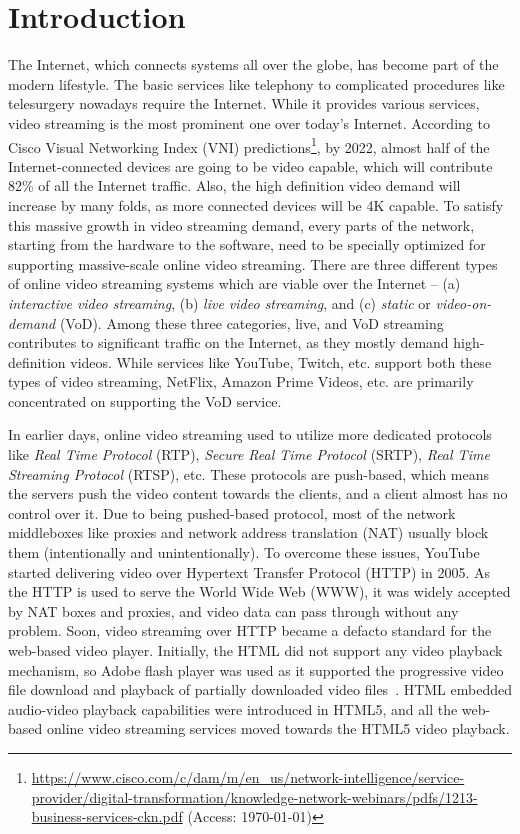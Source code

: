 \section{Introduction}
The Internet, which connects systems all over the globe, has become part of the modern lifestyle. The basic services like telephony to complicated procedures like telesurgery nowadays require the Internet. While it provides various services, video streaming is the most prominent one over today's Internet. According to Cisco Visual Networking Index (VNI) predictions\footnote{\url{https://www.cisco.com/c/dam/m/en_us/network-intelligence/service-provider/digital-transformation/knowledge-network-webinars/pdfs/1213-business-services-ckn.pdf} (Access: \today)}, by 2022, almost half of the Internet-connected devices are going to be video capable, which will contribute 82\% of all the Internet traffic. Also, the high definition video demand will increase by many folds, as more connected devices will be 4K capable. To satisfy this massive growth in video streaming demand, every parts of the network, starting from the hardware to the software, need to be specially optimized for supporting massive-scale online video streaming. There are three different types of online video streaming systems which are viable over the Internet -- (a) \textit{interactive video streaming}, (b) \textit{live video streaming}, and (c) \textit{static} or \textit{video-on-demand} (VoD). Among these three categories, live, and VoD streaming contributes to significant traffic on the Internet, as they mostly demand high-definition videos. While services like YouTube, Twitch, etc. support both these types of video streaming, NetFlix, Amazon Prime Videos, etc. are primarily concentrated on supporting the VoD service. 

In earlier days, online video streaming used to utilize more dedicated protocols like \textit{Real Time Protocol} (RTP), \textit{Secure Real Time Protocol} (SRTP), \textit{Real Time Streaming Protocol} (RTSP), etc. These protocols are push-based, which means the servers push the video content towards the clients, and a client almost has no control over it. Due to being pushed-based protocol, most of the network middleboxes like proxies and network address translation (NAT) usually block them (intentionally and unintentionally). To overcome these issues, YouTube started delivering video over Hypertext Transfer Protocol (HTTP) in 2005. As the HTTP is used to serve the World Wide Web (WWW), it was widely accepted by NAT boxes and proxies, and video data can pass through without any problem. Soon, video streaming over HTTP became a defacto standard for the web-based video player. Initially, the HTML did not support any video playback mechanism, so Adobe flash player was used as it supported the progressive video file download and playback of partially downloaded video files~\cite{gill2007youtube}. HTML embedded audio-video playback capabilities were introduced in HTML5, and all the web-based online video streaming services moved towards the HTML5 video playback.

